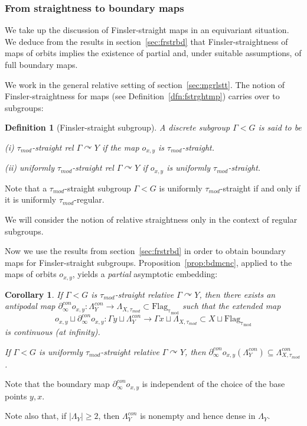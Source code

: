 \documentclass[12pt]{article}
\theoremstyle{boldplain}
\newtheorem{cor}[equation]{Corollary}
\theoremstyle{bolddefinition}
\newtheorem{definition}[equation]{Definition}
\numberwithin{equation}{section}
\def\Ga{\Gamma}
\def\acts{\curvearrowright}
\def\D{\partial}
\def\Flagt{\operatorname{Flag_{\tau_{mod}}}}
\def\geoc{\partial_{\infty}^{con}}
\def\LaXt{\Lambda_{X,\tau_{mod}}}
\def\LaXtc{\Lambda_{X,\tau_{mod}}^{con}}
\def\LaY{\Lambda_Y}
\def\LaYc{\Lambda_Y^{con}}
\def\taumod{\tau_{mod}}
\begin{document}
\subsubsection{From straightness to boundary maps}
\label{sec:fstrctns}

We take up the discussion of Finsler-straight maps in an equivariant situation.
We deduce from the results in section~\ref{sec:frstrbd}
that Finsler-straightness of maps of orbits 
implies the existence of partial and, under suitable assumptions,
of full boundary maps.

We work in the general relative setting of section~\ref{sec:mgrlstt}.
The notion of Finsler-straightness for maps (see Definition~\ref{dfn:fstrghtmp}) carries over to subgroups:
\begin{definition}[Finsler-straight subgroup]
\label{dfn:fstrghtctn}
A discrete subgroup $\Ga<G$ is said to be 

(i) {\em $\taumod$-straight} rel $\Ga\acts Y$ 
if the map $o_{x,y}$ is $\taumod$-straight. 

(ii) {\em uniformly $\taumod$-straight} rel $\Ga\acts Y$ if $o_{x,y}$ is uniformly $\taumod$-straight. 
\end{definition}

Note that a $\taumod$-straight subgroup $\Ga<G$ is uniformly $\taumod$-straight if and only if it is uniformly $\taumod$-regular.

We will consider the notion of relative straightness only in the context of regular subgroups.

\medskip
Now we use the results from section~\ref{sec:frstrbd} 
in order to obtain boundary maps for Finsler-straight subgroups.
Proposition~\ref{prop:bdmcnc}, applied to the maps of orbits $o_{x,y}$, yields a {\em partial} asymptotic embedding:
\begin{cor}
\label{cor:bdmcnc}
If $\Ga<G$ is $\taumod$-straight relative $\Ga\acts Y$,
then there exists an antipodal map $\geoc o_{x,y}:\LaYc\to\LaXt\subset\Flagt$ such that the extended map 
$$ o_{x,y}\sqcup\geoc o_{x,y}:\Ga y\sqcup\LaYc \to \Ga x\sqcup\LaXt \subset X\sqcup\Flagt $$
is continuous (at infinity).

If $\Ga<G$ is uniformly $\taumod$-straight relative $\Ga\acts Y$,
then $\geoc o_{x,y}(\LaYc)\subseteq\LaXtc$.
\end{cor}

Note that 
the boundary map $\D^{con}_\infty o_{x,y}$ is independent of the choice of the base points $y,x$.

Note also that, if $|\LaY|\geq2$, 
then $\LaYc$ is nonempty \cite[Thm.\ 2R]{Tukia1994}
and hence dense in $\LaY$. 
\end{document}
